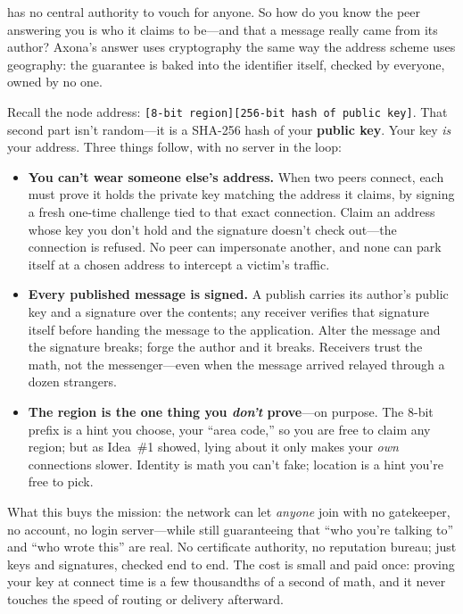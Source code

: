 \documentclass[nobib]{tufte-handout}
\begin{document}
 has no central authority to vouch for anyone. So how do you know the peer answering you is who it claims to be---and that a message really came from its author? Axona's answer uses cryptography the same way the address scheme uses geography: the guarantee is baked into the identifier itself, checked by everyone, owned by no one.

Recall the node address: \texttt{[8-bit region][256-bit hash of public key]}. That second part isn't random---it is a SHA-256 hash of your \textbf{public key}. Your key \emph{is} your address. Three things follow, with no server in the loop:

\begin{itemize}
\setlength{\itemsep}{2pt}
  \item \textbf{You can't wear someone else's address.} When two peers connect, each must prove it holds the private key matching the address it claims, by signing a fresh one-time challenge tied to that exact connection. Claim an address whose key you don't hold and the signature doesn't check out---the connection is refused. No peer can impersonate another, and none can park itself at a chosen address to intercept a victim's traffic.
  \item \textbf{Every published message is signed.} A publish carries its author's public key and a signature over the contents; any receiver verifies that signature itself before handing the message to the application. Alter the message and the signature breaks; forge the author and it breaks. Receivers trust the math, not the messenger---even when the message arrived relayed through a dozen strangers.
  \item \textbf{The region is the one thing you \emph{don't} prove}---on purpose. The 8-bit prefix is a hint you choose, your ``area code,'' so you are free to claim any region; but as Idea~\#1 showed, lying about it only makes your \emph{own} connections slower. Identity is math you can't fake; location is a hint you're free to pick.
\end{itemize}

What this buys the mission: the network can let \emph{anyone} join with no gatekeeper, no account, no login server---while still guaranteeing that ``who you're talking to'' and ``who wrote this'' are real. No certificate authority, no reputation bureau; just keys and signatures, checked end to end. The cost is small and paid once: proving your key at connect time is a few thousandths of a second of math, and it never touches the speed of routing or delivery afterward.
\end{document}
